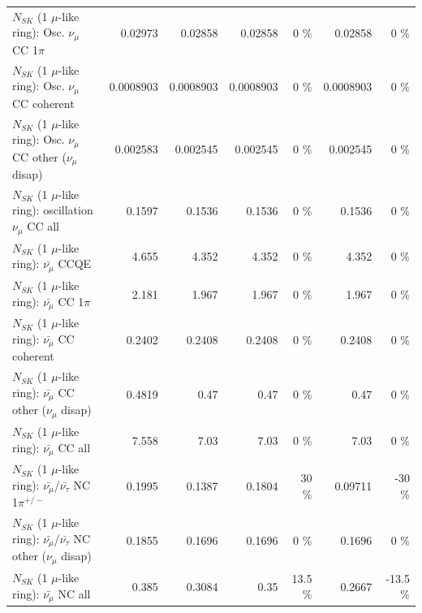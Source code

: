 \begin{table}
\begin{tabular}{| l | r | r | r  r | r  r |}
                          $N_{SK}$ (1 $\mu$-like ring): Osc. $\nu_\mu$ CC 1$\pi$ &         0.02973 &         0.02858 &         0.02858 &        0 \%  &         0.02858 &        0 \%  \\ 
                        $N_{SK}$ (1 $\mu$-like ring): Osc. $\nu_\mu$ CC coherent &       0.0008903 &       0.0008903 &       0.0008903 &        0 \%  &       0.0008903 &        0 \%  \\ 
         $N_{SK}$ (1 $\mu$-like ring): Osc. $\nu_\mu$ CC other ($\nu_\mu$ disap) &        0.002583 &        0.002545 &        0.002545 &        0 \%  &        0.002545 &        0 \%  \\ 
                      $N_{SK}$ (1 $\mu$-like ring): oscillation $\nu_\mu$ CC all &          0.1597 &          0.1536 &          0.1536 &        0 \%  &          0.1536 &        0 \%  \\ 
\hline
\hline
                              $N_{SK}$ (1 $\mu$-like ring): $\bar{\nu_\mu}$ CCQE &           4.655 &           4.352 &           4.352 &        0 \%  &           4.352 &        0 \%  \\ 
                         $N_{SK}$ (1 $\mu$-like ring): $\bar{\nu_\mu}$ CC 1$\pi$ &           2.181 &           1.967 &           1.967 &        0 \%  &           1.967 &        0 \%  \\ 
                       $N_{SK}$ (1 $\mu$-like ring): $\bar{\nu_\mu}$ CC coherent &          0.2402 &          0.2408 &          0.2408 &        0 \%  &          0.2408 &        0 \%  \\ 
        $N_{SK}$ (1 $\mu$-like ring): $\bar{\nu_\mu}$ CC other ($\nu_\mu$ disap) &          0.4819 &            0.47 &            0.47 &        0 \%  &            0.47 &        0 \%  \\ 
                          $N_{SK}$ (1 $\mu$-like ring): $\bar{\nu_{\mu}}$ CC all &           7.558 &            7.03 &            7.03 &        0 \%  &            7.03 &        0 \%  \\ 
\hline
  $N_{SK}$ (1 $\mu$-like ring): $\bar{\nu_\mu}$/$\bar{\nu_\tau}$ NC 1$\pi^{+/-}$ &          0.1995 &          0.1387 &          0.1804 &       30 \%  &         0.09711 &      -30 \%  \\ 
$N_{SK}$ (1 $\mu$-like ring): $\bar{\nu_\mu}$/$\bar{\nu_\tau}$ NC other ($\nu_\mu$ disap) &          0.1855 &          0.1696 &          0.1696 &        0 \%  &          0.1696 &        0 \%  \\ 
                          $N_{SK}$ (1 $\mu$-like ring): $\bar{\nu_{\mu}}$ NC all &           0.385 &          0.3084 &            0.35 &     13.5 \%  &          0.2667 &    -13.5 \%  \\ 

\end{tabular}
\end{table}
